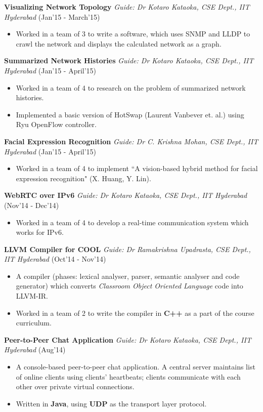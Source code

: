 \documentclass[9pt]{extarticle}
\begin{document}
\textbf{Visualizing Network Topology} \textit{Guide: Dr Kotaro Kataoka, CSE Dept., IIT Hyderabad} \hfill (Jan'15 - March'15)
\begin{itemize}
\item Worked in a team of 3 to write a software, which uses SNMP and LLDP to crawl the network and displays the calculated network as a
graph.
\end{itemize}
\space
\textbf{Summarized Network Histories} \textit{Guide: Dr Kotaro Kataoka, CSE Dept., IIT Hyderabad} \hfill (Jan'15 - April'15)
\begin{itemize}
\item Worked in a team of 4 to research on the problem of summarized network histories.
\item Implemented a basic version of HotSwap (Laurent Vanbever et. al.) using Ryu OpenFlow controller.
\end{itemize}
\space
\textbf{Facial Expression Recognition} \textit{Guide: Dr C. Krishna Mohan, CSE Dept., IIT Hyderabad} \hfill (Jan'15 - April'15)
\begin{itemize}
\item Worked in a team of 4 to implement ``A vision-based hybrid method for facial expression recognition" (X. Huang, Y. Lin).
\end{itemize}
\space
\textbf{WebRTC over IPv6} \textit{Guide: Dr Kotaro Kataoka, CSE Dept., IIT Hyderabad} \hfill (Nov'14 - Dec'14)
\begin{itemize}
\item Worked in a team of 4 to develop a real-time communication system which works for IPv6.
\end{itemize}
\space
\textbf{LLVM Compiler for COOL} \textit{Guide: Dr Ramakrishna Upadrasta, CSE Dept., IIT Hyderabad} \hfill (Oct'14 - Nov'14)
\begin{itemize}
\item A compiler (phases: lexical analyser, parser, semantic analyser and code generator) which converts \textit{Classroom Object Oriented Language} code into LLVM-IR.
\item Worked in a team of 2 to write the compiler in \textbf{C++} as a part of the course curriculum.
\end{itemize}
\space
\textbf{Peer-to-Peer Chat Application} \textit{Guide: Dr Kotaro Kataoka, CSE Dept., IIT Hyderabad} \hfill (Aug'14)
\begin{itemize}
\item A console-based peer-to-peer chat application. A central server maintains list of online clients using clients’ heartbeats; clients communicate with each other over private virtual connections.
\item Written in \textbf{Java}, using \textbf{UDP} as the transport layer protocol.
\end{itemize}
\end{document}
